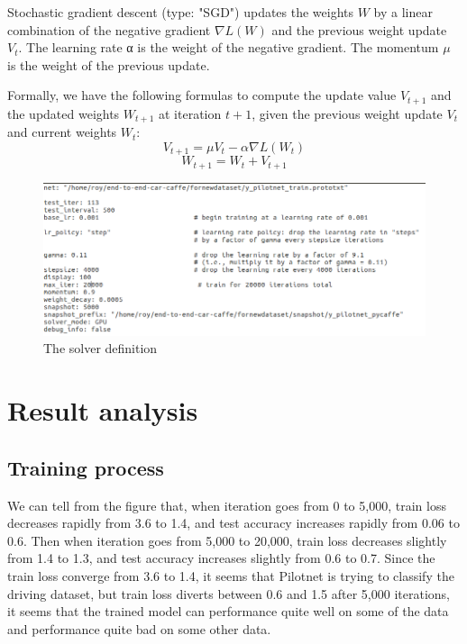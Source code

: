 \documentclass[conference]{IEEEtran}
\begin{document}
Stochastic gradient descent (type: "SGD") updates the weights $W$ by a linear combination of the negative gradient $\nabla L(W)$ and the previous weight update $V_t$. The learning rate α is the weight of the negative gradient. The momentum $μ$ is the weight of the previous update.\par

Formally, we have the following formulas to compute the update value $V_{t+1}$
and the updated weights $W_{t+1}$ at iteration $t+1$, given the previous weight update $V_t$ and current weights $W_{t}$:
\[V_{t+1} = μV_{t} - α\nabla L(W_{t})  \]
\[W_{t+1} = W_{t} + V_{t+1}  \]


\begin{figure}[h]
	\begin{center}
		
		\includegraphics[width=0.8\linewidth]{fig6.png}
	\end{center}
	\caption{The solver definition}
	\label{fig:long6}
\end{figure}





\section{Result analysis}


\subsection{Training process}

We can tell from the figure that, when iteration goes from 0 to 5,000, train loss decreases rapidly from 3.6 to 1.4, and test accuracy increases rapidly from 0.06 to 0.6. Then when iteration goes from 5,000 to 20,000, train loss decreases slightly from 1.4 to 1.3, and test accuracy increases slightly from 0.6 to 0.7. Since the train loss converge from 3.6 to 1.4, it seems that Pilotnet is trying to classify the driving dataset, but train loss diverts between 0.6 and 1.5 after 5,000 iterations, it seems that the trained model can performance quite well on some of the data and performance quite bad on some other data.
\end{document}
